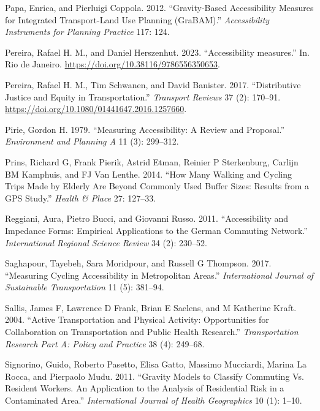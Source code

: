 \documentclass[preprint, 3p,
authoryear]{elsarticle} %
\newlength{\cslhangindent}
\newlength{\cslentryspacingunit} %
\newenvironment{CSLReferences}[2] %
 {%
  \setlength{\parindent}{0pt}
  \ifodd #1
  \let\oldpar\par
  \def\par{\hangindent=\cslhangindent\oldpar}
  \fi
  \setlength{\parskip}{#2\cslentryspacingunit}
 }%
 {}
\begin{document}
\begin{CSLReferences}{1}{0}
\leavevmode{}%
Papa, Enrica, and Pierluigi Coppola. 2012. {``Gravity-Based
Accessibility Measures for Integrated Transport-Land Use Planning
(GraBAM).''} \emph{Accessibility Instruments for Planning Practice} 117:
124.

\leavevmode{}%
Pereira, Rafael H. M., and Daniel Herszenhut. 2023. {``Accessibility
measures.''} In. Rio de Janeiro.
\url{https://doi.org/10.38116/9786556350653}.

\leavevmode{}%
Pereira, Rafael H. M., Tim Schwanen, and David Banister. 2017.
{``Distributive Justice and Equity in Transportation.''} \emph{Transport
Reviews} 37 (2): 170--91.
\url{https://doi.org/10.1080/01441647.2016.1257660}.

\leavevmode{}%
Pirie, Gordon H. 1979. {``Measuring Accessibility: A Review and
Proposal.''} \emph{Environment and Planning A} 11 (3): 299--312.

\leavevmode{}%
Prins, Richard G, Frank Pierik, Astrid Etman, Reinier P Sterkenburg,
Carlijn BM Kamphuis, and FJ Van Lenthe. 2014. {``How Many Walking and
Cycling Trips Made by Elderly Are Beyond Commonly Used Buffer Sizes:
Results from a GPS Study.''} \emph{Health \& Place} 27: 127--33.

\leavevmode{}%
Reggiani, Aura, Pietro Bucci, and Giovanni Russo. 2011. {``Accessibility
and Impedance Forms: Empirical Applications to the German Commuting
Network.''} \emph{International Regional Science Review} 34 (2):
230--52.

\leavevmode{}%
Saghapour, Tayebeh, Sara Moridpour, and Russell G Thompson. 2017.
{``Measuring Cycling Accessibility in Metropolitan Areas.''}
\emph{International Journal of Sustainable Transportation} 11 (5):
381--94.

\leavevmode{}%
Sallis, James F, Lawrence D Frank, Brian E Saelens, and M Katherine
Kraft. 2004. {``Active Transportation and Physical Activity:
Opportunities for Collaboration on Transportation and Public Health
Research.''} \emph{Transportation Research Part A: Policy and Practice}
38 (4): 249--68.

\leavevmode{}%
Signorino, Guido, Roberto Pasetto, Elisa Gatto, Massimo Mucciardi,
Marina La Rocca, and Pierpaolo Mudu. 2011. {``Gravity Models to Classify
Commuting Vs. Resident Workers. An Application to the Analysis of
Residential Risk in a Contaminated Area.''} \emph{International Journal
of Health Geographics} 10 (1): 1--10.


\end{CSLReferences}
\end{document}
